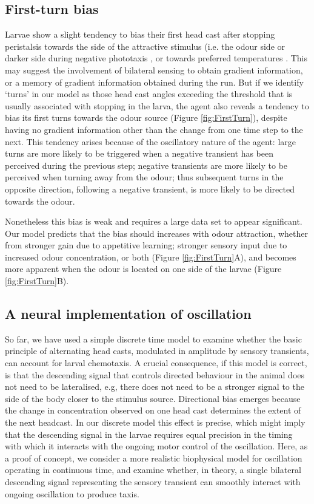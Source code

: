 \documentclass[11pt,a4paper]{article}
\begin{document}
\subsection{First-turn bias}
Larvae show a slight tendency to bias their first head cast after stopping peristalsis towards the side of the attractive stimulus (i.e. the odour side \citep{gomez2011active,gomez2012active} or darker side during negative phototaxis \citep{kane2013sensorimotor}, or towards preferred temperatures \citep{luo2010navigational}. This may suggest the involvement of bilateral sensing to obtain gradient information, or a memory of gradient information obtained during the run. But if we identify ‘turns’ in our model as those head cast angles exceeding the threshold that is usually associated with stopping in the larva, the agent also reveals a tendency to bias its first turns towards the odour source (Figure \ref{fig:FirstTurn}), despite having no gradient information other than the change from one time step to the next. This tendency arises because of the oscillatory nature of the agent: large turns are more likely to be triggered when a negative transient has been perceived during the previous step; negative transients are more likely to be perceived when turning away from the odour; thus subsequent turns in the opposite direction, following a negative transient, is more likely to be directed towards the odour. 

Nonetheless this bias is weak and requires a large data set to appear significant. Our model predicts that the bias should  increases with odour attraction, whether from stronger gain due to appetitive learning; stronger sensory input due to increased odour concentration, or both (Figure \ref{fig:FirstTurn}A), and becomes more apparent when the odour is located on one side of the larvae (Figure \ref{fig:FirstTurn}B).

\subsection{A neural implementation of oscillation}
So far, we have used a simple discrete time model to examine whether the basic principle of alternating head casts, modulated in amplitude by sensory transients, can account for larval chemotaxis. A crucial consequence, if this model is correct, is that the descending signal that controls directed behaviour in the animal does not need to be lateralised, e.g, there does not need to be a stronger signal to the side of the body closer to the stimulus source. Directional bias emerges because the change in concentration observed on one head cast determines the extent of the next headcast. In our discrete model this effect is precise, which might imply that the descending signal in the larvae requires equal precision in the timing with which it interacts with the ongoing motor control of the oscillation. Here, as a proof of concept, we consider a more realistic biophysical model for oscillation operating in continuous time, and examine whether, in theory, a single bilateral descending signal representing the sensory transient can smoothly interact with ongoing oscillation to produce taxis.
\end{document}
